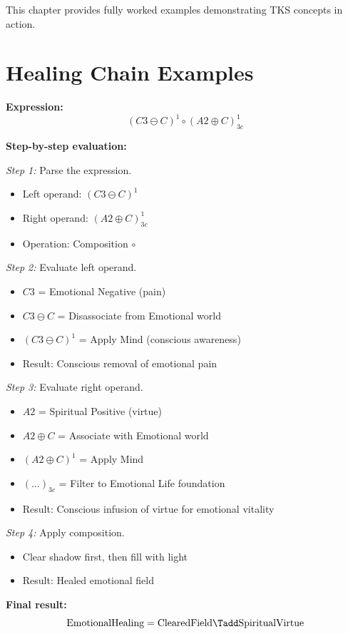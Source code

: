 This chapter provides fully worked examples demonstrating TKS concepts in action.

\section{Healing Chain Examples}

\begin{example}
\label{ex:emotional-healing}
\textbf{Expression:}
\[
(C3 \ominus C)^1 \circ (A2 \oplus C)^1_{3c}
\]

\textbf{Step-by-step evaluation:}

\textit{Step 1:} Parse the expression.
\begin{itemize}
  \item Left operand: $(C3 \ominus C)^1$
  \item Right operand: $(A2 \oplus C)^1_{3c}$
  \item Operation: Composition $\circ$
\end{itemize}

\textit{Step 2:} Evaluate left operand.
\begin{itemize}
  \item $C3$ = Emotional Negative (pain)
  \item $C3 \ominus C$ = Disassociate from Emotional world
  \item $(C3 \ominus C)^1$ = Apply Mind (conscious awareness)
  \item Result: Conscious removal of emotional pain
\end{itemize}

\textit{Step 3:} Evaluate right operand.
\begin{itemize}
  \item $A2$ = Spiritual Positive (virtue)
  \item $A2 \oplus C$ = Associate with Emotional world
  \item $(A2 \oplus C)^1$ = Apply Mind
  \item $(\ldots)_{3c}$ = Filter to Emotional Life foundation
  \item Result: Conscious infusion of virtue for emotional vitality
\end{itemize}

\textit{Step 4:} Apply composition.
\begin{itemize}
  \item Clear shadow first, then fill with light
  \item Result: Healed emotional field
\end{itemize}

\textbf{Final result:}
\[
\mathrm{EmotionalHealing} = \mathrm{ClearedField} \Tadd \mathrm{SpiritualVirtue}
\]
\end{example}

